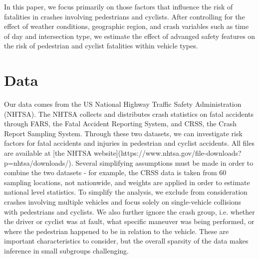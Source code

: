 \documentclass[12pt]{article}
\begin{document}
In this paper, we focus primarily on those factors that influence the risk of fatalities in crashes involving pedestrians
and cyclists. After controlling for the effect of weather conditions,
geographic region, and crash variables such as time of day and intersection type, we estimate the effect
of advanged safety features on the risk of pedestrian and cyclist fatalities within vehicle types.


\section{Data}

Our data comes from the US National Highway Traffic Safety Administration (NHTSA). The NHTSA collects and distributes
crash statistics on fatal accidents through FARS, the Fatal Accident Reporting System, and CRSS, the Crash Report
Sampling System. Through these two datasets, we can investigate risk factors for fatal accidents and injuries in
pedestrian and cyclist accidents. All files are available at
[the NHTSA website](https://www.nhtsa.gov/file-downloads?p=nhtsa/downloads/). Several simplifying assumptions must be
made in order to combine the two datasets - for example, the CRSS data is taken from 60 sampling locations, not
nationwide, and weights are applied in order to estimate national level
statistics\cite{national_highway_traffic_safety_administration_crash_nodate}.  To simplify the analysis, we exclude
from consideration crashes involving multiple vehicles and focus solely on single-vehicle collisions with pedestrians
and cyclists. We also further ignore the crash group, i.e. whether the driver or cyclist was at fault, what
specific maneuver was being performed, or where the pedestrian happened to be in relation to the vehicle. These are
important characteristics to consider, but the overall sparsity of the data makes inference in small subgroups
challenging.

\end{document}
